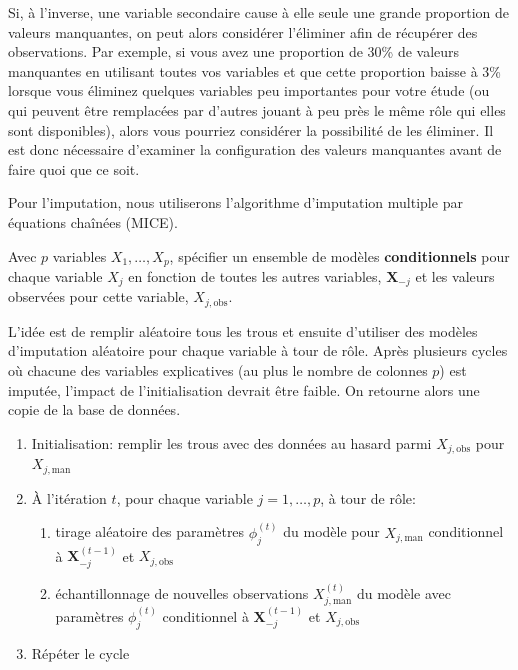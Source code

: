 \documentclass[
  11pt,
  letterpaper,
]{scrbook}
\providecommand{\tightlist}{%
  \setlength{\itemsep}{0pt}\setlength{\parskip}{0pt}}\usepackage{longtable,booktabs,array}
\theoremstyle{definition}
\theoremstyle{remark}
\begin{document}
Si, à l'inverse, une variable secondaire cause à elle seule une grande
proportion de valeurs manquantes, on peut alors considérer l'éliminer
afin de récupérer des observations. Par exemple, si vous avez une
proportion de 30\% de valeurs manquantes en utilisant toutes vos
variables et que cette proportion baisse à 3\% lorsque vous éliminez
quelques variables peu importantes pour votre étude (ou qui peuvent être
remplacées par d'autres jouant à peu près le même rôle qui elles sont
disponibles), alors vous pourriez considérer la possibilité de les
éliminer. Il est donc nécessaire d'examiner la configuration des valeurs
manquantes avant de faire quoi que ce soit.

Pour l'imputation, nous utiliserons l'algorithme d'imputation multiple
par équations chaînées (MICE).

Avec \(p\) variables \(X_1, \ldots, X_p\), spécifier un ensemble de
modèles \textbf{conditionnels} pour chaque variable \(X_j\) en fonction
de toutes les autres variables, \(\boldsymbol{X}_{-j}\) et les valeurs
observées pour cette variable, \(X_{j, \text{obs}}\).

L'idée est de remplir aléatoire tous les trous et ensuite d'utiliser des
modèles d'imputation aléatoire pour chaque variable à tour de rôle.
Après plusieurs cycles où chacune des variables explicatives (au plus le
nombre de colonnes \(p\)) est imputée, l'impact de l'initialisation
devrait être faible. On retourne alors une copie de la base de données.

\begin{enumerate}
\def\labelenumi{\arabic{enumi}.}
\tightlist
\item
  Initialisation: remplir les trous avec des données au hasard parmi
  \(X_{j, \text{obs}}\) pour \(X_{j, \text{man}}\)
\item
  À l'itération \(t\), pour chaque variable \(j=1, \ldots, p\), à tour
  de rôle:

  \begin{enumerate}
  \def\labelenumii{\alph{enumii})}
  \tightlist
  \item
    tirage aléatoire des paramètres \(\phi_j^{(t)}\) du modèle pour
    \(X_{j,\text{man}}\) conditionnel à \(\boldsymbol{X}_{-j}^{(t-1)}\)
    et \(X_{j, \text{obs}}\)
  \item
    échantillonnage de nouvelles observations \(X^{(t)}_{j,\text{man}}\)
    du modèle avec paramètres \(\phi_j^{(t)}\) conditionnel à
    \(\boldsymbol{X}_{-j}^{(t-1)}\) et \(X_{j, \text{obs}}\)
  \end{enumerate}
\item
  Répéter le cycle
\end{enumerate}
\end{document}
